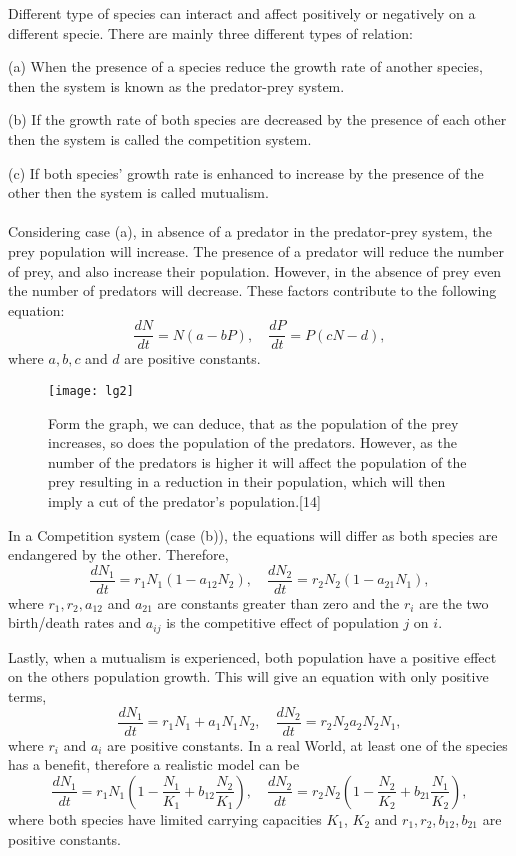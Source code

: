 \documentclass[a4paper]{report}
\theoremstyle{definition}
\begin{document}
Different type of species can interact and affect positively or negatively on a different specie. There are mainly three different types of relation:

(a) When the presence of a species reduce the growth rate of another species, then the system is known as the predator-prey system.

(b) If the growth rate of both species are decreased by the presence of each other then the system is called the competition system.

(c) If  both species' growth rate is enhanced to increase by the presence of the other then the system is called mutualism.
\\
\\
Considering case (a), in absence of a predator in the predator-prey system, the prey population will increase. The presence of a predator will reduce the number of prey, and also increase their population. However, in the absence of prey even the number of predators will decrease. These factors contribute to the following equation:
\begin{equation}
\frac{dN}{dt}=N(a-bP), \quad \frac{dP}{dt}=P(cN-d),
\end{equation}
where $a,b,c$ and $d$ are positive constants.
\begin{figure}[h]
\texttt{[image: lg2]}
\caption{Form the graph, we can deduce, that as the population of the prey increases, so does the population of the predators. However, as the number of the predators is higher it will affect the population of the prey resulting in a reduction in their population, which will then imply a cut of the predator's population.[14]}
\label{lgfigure2}
\end{figure}

In a Competition system (case (b)), the equations will differ as both species are endangered by the other. Therefore,
\begin{equation}
\frac{dN_1}{dt}=r_1N_1(1-a_{12}N_2), \quad \frac{dN_2}{dt}=r_2N_2(1-a_{21}N_1),
\end{equation}
where $r_1,r_2,a_{12}$ and $a_{21}$ are constants greater than zero and the $r_i$ are the two birth/death rates and $a_{ij}$ is the competitive effect of population $j$ on $i$.

Lastly, when a mutualism is experienced, both population have a positive effect on the others population growth. This will give an equation with only positive terms,
\begin{equation}
\frac{dN_1}{dt}=r_1N_1+a_1N_1N_2, \quad \frac{dN_2}{dt}=r_2N_2a_2N_2N_1,
\end{equation}
where $r_i$ and $a_i$ are positive constants.
In a real World, at least one of the species has a benefit, therefore a realistic model can be
\begin{equation}
\frac{dN_1}{dt}=r_1N_1\left(1-\frac{N_1}{K_1}+b_{12}\frac{N_2}{K_1}\right), \quad \frac{dN_2}{dt}=r_2N_2\left(1-\frac{N_2}{K_2}+b_{21}\frac{N_1}{K_2}\right),
\end{equation}
where both species have limited carrying capacities $K_1$, $K_2$ and $r_1, r_2, b_{12}, b_{21}$ are positive constants.
\end{document}
